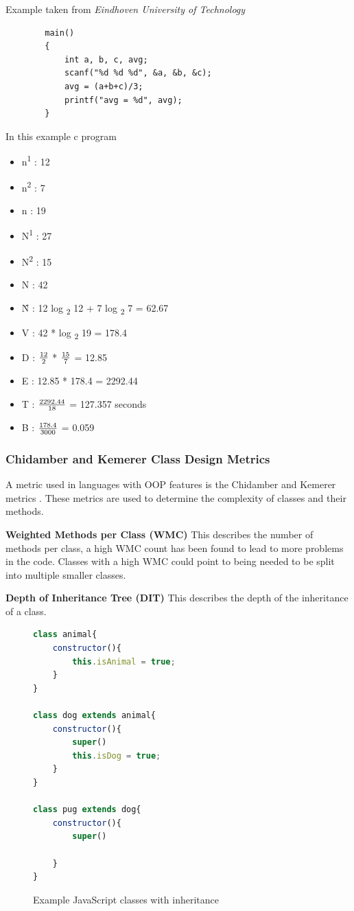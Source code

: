 Example taken from \textit{Eindhoven University of Technology} \cite{softwareEvolution}
\begin{verbatim}
        main()
        {
            int a, b, c, avg;
            scanf("%d %d %d", &a, &b, &c);
            avg = (a+b+c)/3;
            printf("avg = %d", avg);
        }
    \end{verbatim}
In this example c program
\begin{itemize}
    \item n\textsuperscript{1} : 12
    \item n\textsuperscript{2} : 7
    \item n : 19
    \item N\textsuperscript{1} : 27
    \item N\textsuperscript{2} : 15
    \item N : 42
    \item \^{N} : 12 log \textsubscript{2} 12 + 7 log \textsubscript{2} 7 = 62.67
    \item V : 42 * log \textsubscript{2} 19 = 178.4
    \item D : $\frac{\text{12}}{\text{2}}$ * $\frac{\text{15}}{\text{7}}$ = 12.85
    \item E : 12.85 * 178.4 = 2292.44
    \item T : $\frac{\text{2292.44}}{\text{18}}$ = 127.357 seconds
    \item B : $\frac{\text{178.4}}{\text{3000}}$ = 0.059
\end{itemize}


\subsubsection{\textbf{Chidamber and Kemerer Class Design Metrics}}
A metric used in languages with OOP features is the Chidamber and Kemerer metrics \cite{classDesignMetrics}.
These metrics are used to determine the complexity of classes and their methods.

\textbf{Weighted Methods per Class (WMC)}
This describes the number of methods per class, a high WMC count has been found to lead to more problems in the code.
Classes with a high WMC could point to being needed to be split into multiple smaller classes.

\textbf{Depth of Inheritance Tree (DIT)}
This describes the depth of the inheritance of a class.
\begin{figure}[h]
    \begin{lstlisting}[language=Javascript]
class animal{
    constructor(){
        this.isAnimal = true;
    }
}

class dog extends animal{
    constructor(){
        super()
        this.isDog = true;
    }
}

class pug extends dog{
    constructor(){
        super()
         
    }
}
                \end{lstlisting}
    \caption{Example JavaScript classes with inheritance}
    \label{fig:DIT}
\end{figure}

